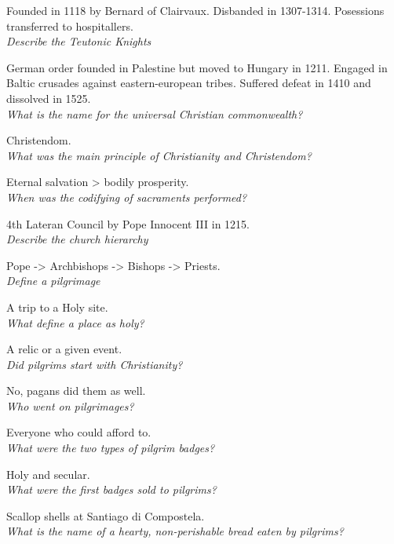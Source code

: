 \documentclass[12pt]{article}
\begin{document}
Founded in 1118 by Bernard of Clairvaux. Disbanded in 1307-1314. Posessions transferred to hospitallers.\\

\textit{Describe the Teutonic Knights}

German order founded in Palestine but moved to Hungary in 1211. Engaged in Baltic crusades against eastern-european tribes. Suffered defeat in 1410 and dissolved in 1525.\\

\textit{What is the name for the universal Christian commonwealth?}

Christendom.\\

\textit{What was the main principle of Christianity and Christendom?}

Eternal salvation > bodily prosperity.\\

\textit{When was the codifying of sacraments performed?}

4th Lateran Council by Pope Innocent III in 1215.\\

\textit{Describe the church hierarchy}

Pope -> Archbishops -> Bishops -> Priests.\\

\textit{Define a pilgrimage}

A trip to a Holy site.\\

\textit{What define a place as holy?}

A relic or a given event.\\

\textit{Did pilgrims start with Christianity?}

No, pagans did them as well.\\

\textit{Who went on pilgrimages?}

Everyone who could afford to.\\

\textit{What were the two types of pilgrim badges?}

Holy and secular.\\

\textit{What were the first badges sold to pilgrims?}

Scallop shells at Santiago di Compostela.\\

\textit{What is the name of a hearty, non-perishable bread eaten by pilgrims?}
\end{document}
